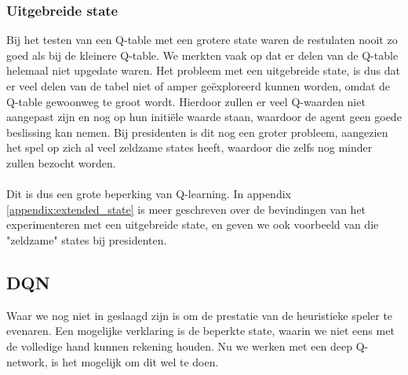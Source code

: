 \documentclass[11pt]{article}
\begin{document}
\subsubsection{Uitgebreide state}
Bij het testen van een Q-table met een grotere state waren de restulaten nooit zo goed als bij de kleinere Q-table. We merkten vaak op dat er delen van de Q-table helemaal niet upgedate waren. Het probleem met een uitgebreide state, is dus dat er veel delen van de tabel niet of amper geëxploreerd kunnen worden, omdat de Q-table gewoonweg te groot wordt. Hierdoor zullen er veel Q-waarden niet aangepast zijn en nog op hun initiële waarde staan, waardoor de agent geen goede beslissing kan nemen. Bij presidenten is dit nog een groter probleem, aangezien het spel op zich al veel zeldzame states heeft, waardoor die zelfs nog minder zullen bezocht worden.\\\\ 
Dit is dus een grote beperking van Q-learning. In appendix \ref{appendix:extended_state} is meer geschreven over de bevindingen van het experimenteren met een uitgebreide state, en geven we ook voorbeeld van die "zeldzame" states bij presidenten.

\subsection{DQN}
Waar we nog niet in geslaagd zijn is om de prestatie van de heuristieke speler te evenaren. Een mogelijke verklaring is de beperkte state, waarin we niet eens met de volledige hand kunnen rekening houden. Nu we werken met een deep Q-network, is het mogelijk om dit wel te doen.
\end{document}
